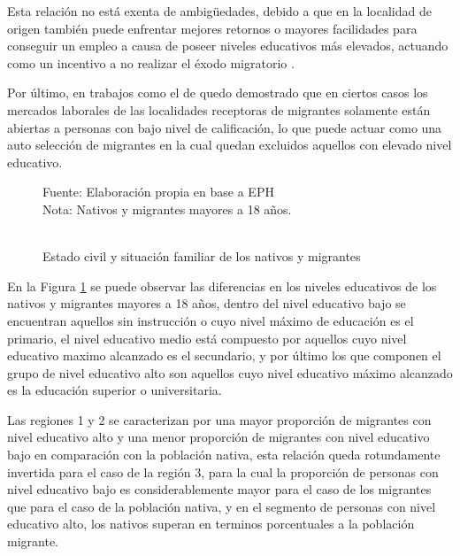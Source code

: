 \documentclass[12pt,a4paper]{article}
\begin{document}
Esta relación no está exenta de ambigüedades, debido a que en la localidad de origen también puede enfrentar mejores retornos o mayores facilidades para conseguir un empleo a causa de poseer niveles educativos más elevados, actuando como un incentivo a no realizar el éxodo migratorio \parencite{danzer_economic_2008}.

Por último, en trabajos como el de \textcite{stark_migration_1991} quedo demostrado que en ciertos casos los mercados laborales de las localidades receptoras de migrantes solamente están abiertas a personas con bajo nivel de calificación, lo que puede actuar como una auto selección de migrantes en la cual quedan excluidos aquellos con elevado nivel educativo.

\begin{figure}[ht!]
\begin{center}
\caption{\\Estado civil y situación familiar de los nativos y migrantes}
\label{figure:niveled_mig}
 
\end{center}
\begin{flushleft}
\begin{scriptsize}
Fuente: Elaboración propia en base a EPH\\
Nota: Nativos y migrantes mayores a 18 años.
\end{scriptsize}
\end{flushleft}
\end{figure}

En la Figura \ref{figure:niveled_mig} se puede observar las diferencias en los niveles educativos de los nativos y migrantes mayores a 18 años, dentro del nivel educativo bajo se encuentran aquellos sin instrucción o cuyo nivel máximo de educación es el primario, el nivel educativo medio está compuesto por aquellos cuyo nivel educativo maximo alcanzado es el secundario, y por último los que componen el grupo de nivel educativo alto son aquellos cuyo nivel educativo máximo alcanzado es la educación superior o universitaria.

Las regiones 1 y 2 se caracterizan por una mayor proporción de migrantes con nivel educativo alto y una menor proporción de migrantes con nivel educativo bajo en comparación con la población nativa, esta relación queda rotundamente invertida para el caso de la región 3, para la cual la proporción de personas con nivel educativo bajo es considerablemente mayor para el caso de los migrantes que para el caso de la población nativa, y en el segmento de personas con nivel educativo alto, los nativos superan en terminos porcentuales a la población migrante.
\end{document}
